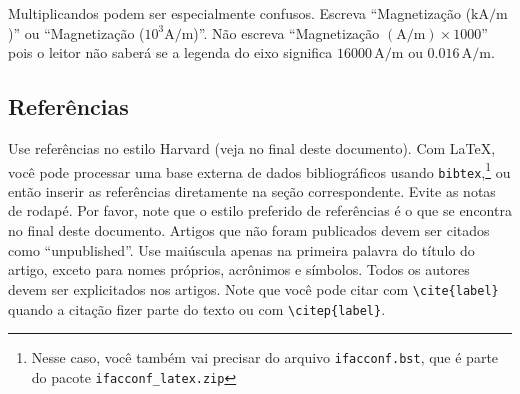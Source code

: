 \documentclass[a4paper]{ifacconf}
\begin{document}
Multiplicandos podem ser especialmente confusos. Escreva  ``Magnetização 
($\mathrm{kA}/\mathrm{m}$)'' ou ``Magnetização ($10^3 \mathrm{A}/\mathrm{m}$)''. 
Não escreva 
``Magnetização $(\mathrm{A}/\mathrm{m}) \times 1000$'' pois o leitor não saberá
se a legenda do eixo significa 
$16000\,\mathrm{A}/\mathrm{m}$ ou $0.016\,\mathrm{A}/\mathrm{m}$.

%

\subsection{Referências}

Use referências no estilo Harvard (veja no final deste documento). Com
\LaTeX, você pode processar uma base externa de dados bibliográficos 
usando \texttt{bibtex},\footnote{Nesse caso, você também vai precisar do arquivo \texttt{ifacconf.bst}, que é parte do pacote \texttt{ifacconf\_latex.zip}} ou então inserir
as referências diretamente na seção correspondente. Evite as notas de rodapé.
Por favor, note que o estilo preferido de referências é o que se encontra no
final deste documento. Artigos que não foram publicados devem ser citados 
como ``unpublished''. Use maiúscula apenas na primeira palavra do título
do artigo, exceto para nomes próprios, acrônimos e símbolos. Todos os autores
devem ser explicitados nos artigos. Note que você pode citar com \texttt{\textbackslash cite\{label\}} quando a citação fizer parte do texto ou com \texttt{\textbackslash citep\{label\}}.

\end{document}
